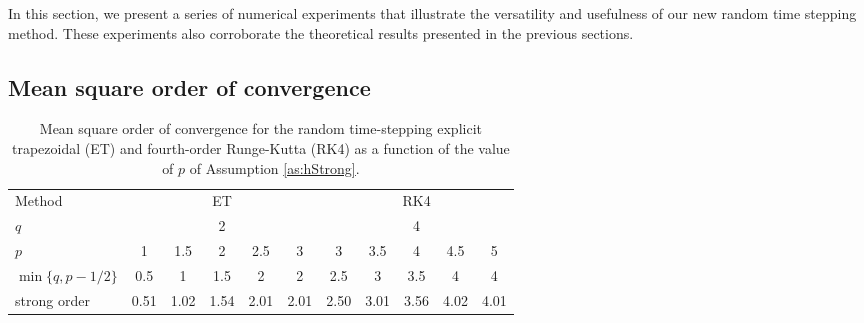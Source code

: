 \documentclass{siamart1116}
\numberwithin{theorem}{section}
\begin{document}
In this section, we present a series of numerical experiments that illustrate the versatility and usefulness of our new random time stepping method. These experiments also corroborate the theoretical results presented in the previous sections.

\subsection{Mean square order of convergence}

\begin{table}[!t]
	\centering
	\begin{tabular}{l|ccccc|ccccc}
		\toprule
		Method & \multicolumn{5}{c|}{ET} & \multicolumn{5}{c}{RK4} \\ 
		\cmidrule(l{2pt}r{2pt}){2-6} \cmidrule(l{2pt}r{2pt}){7-11} 
		$q$ & \multicolumn{5}{c|}{2} & \multicolumn{5}{c}{4} \\
		$p$ & 1 & 1.5 & 2 & 2.5 & 3 & 3 & 3.5 & 4 & 4.5 & 5\\
		$\min\{q, p - 1/2\}$ & 0.5 & 1 & 1.5 & 2 & 2 & 2.5 & 3 & 3.5 & 4 & 4 \\
		strong order & 0.51 & 1.02 & 1.54 & 2.01 & 2.01 & 2.50 & 3.01 & 3.56 & 4.02 & 4.01 \\
		\bottomrule
	\end{tabular}
	\caption{Mean square order of convergence for the random time-stepping explicit trapezoidal (ET) and fourth-order Runge-Kutta (RK4) as a function of the value of $p$ of Assumption \ref{as:hStrong}.}
	\label{tab:NumericalResultsStrongOrder}
\end{table}
\end{document}
